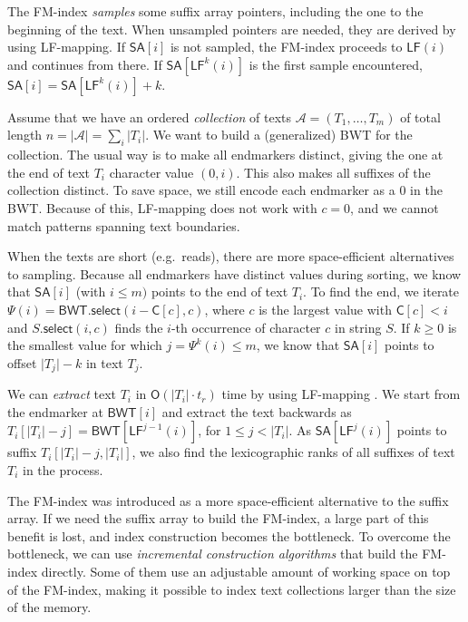 \documentclass[smallabstract,smallcaptions]{dccpaper}
\newcommand{\abs}[1]{\ensuremath{\lvert #1 \rvert}}
\newcommand{\Oh}{\ensuremath{\mathsf{O}}}
\newcommand{\BWT}{\textsf{BWT}}
\newcommand{\mSA}{\ensuremath{\mathsf{SA}}}
\newcommand{\mBWT}{\ensuremath{\mathsf{BWT}}}
\newcommand{\mC}{\ensuremath{\mathsf{C}}}
\newcommand{\LF}{\textsf{LF}}
\newcommand{\mLF}{\ensuremath{\mathsf{LF}}}
\newcommand{\mselect}{\ensuremath{\mathsf{select}}}
\newcommand{\Acoll}{\ensuremath{\mathcal{A}}}
\begin{document}
The FM-index \emph{samples} some suffix array pointers, including the one to the beginning of the text. When unsampled pointers are needed, they are derived by using \LF\nobreakdash-mapping. If $\mSA[i]$ is not sampled, the FM-index proceeds to $\mLF(i)$ and continues from there. If $\mSA[\mLF^{k}(i)]$ is the first sample encountered, $\mSA[i] = \mSA[\mLF^{k}(i)] + k$.

Assume that we have an ordered \emph{collection} of texts $\Acoll = (T_{1}, \dotsc, T_{m})$ of total length $n = \abs{\Acoll} = \sum_{i} \abs{T_{i}}$. We want to build a (generalized) \BWT{} for the collection. The usual way is to make all endmarkers distinct, giving the one at the end of text $T_{i}$ character value $(0,i)$. This also makes all suffixes of the collection distinct. To save space, we still encode each endmarker as a $0$ in the \BWT{}. Because of this, \LF\nobreakdash-mapping does not work with $c = 0$, and we cannot match patterns spanning text boundaries.

When the texts are short (e.g.~reads), there are more space-efficient alternatives to sampling. Because all endmarkers have distinct values during sorting, we know that $\mSA[i]$ (with $i \le m)$ points to the end of text $T_{i}$. To find the end, we iterate $\Psi(i) = \mBWT.\mselect(i - \mC[c], c)$, where $c$ is the largest value with $\mC[c] < i$ and $S.\mselect(i,c)$ finds the $i$\nobreakdash-th occurrence of character $c$ in string $S$. If $k \ge 0$ is the smallest value for which $j = \Psi^{k}(i) \le m$, we know that $\mSA[i]$ points to offset $\abs{T_{j}} - k$ in text $T_{j}$.

We can \emph{extract} text $T_{i}$ in $\Oh(\abs{T_{i}} \cdot t_{r})$ time by using \LF\nobreakdash-mapping \cite{Burrows1994}. We start from the endmarker at $\mBWT[i]$ and extract the text backwards as $T_{i}[\abs{T_{i}} - j] = \mBWT[\LF^{j-1}(i)]$, for $1 \le j < \abs{T_{i}}$. As $\mSA[\LF^{j}(i)]$ points to suffix $T_{i}[\abs{T_{i}}-j, \abs{T_{i}}]$, we also find the lexicographic ranks of all suffixes of text $T_{i}$ in the process.


\Section{Space-efficient \BWT{} construction}

The FM-index was introduced as a more space-efficient alternative to the suffix array. If we need the suffix array to build the FM-index, a large part of this benefit is lost, and index construction becomes the bottleneck. To overcome the bottleneck, we can use \emph{incremental construction algorithms} that build the FM-index directly. Some of them use an adjustable amount of working space on top of the FM-index, making it possible to index text collections larger than the size of the memory.
\end{document}
